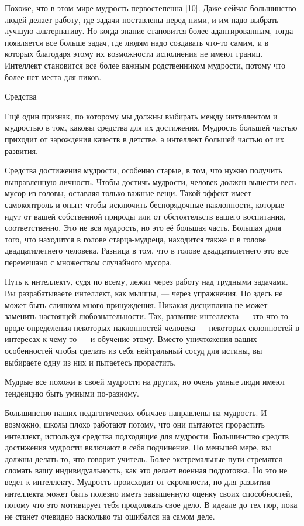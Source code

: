 \documentclass[ebook,12pt,oneside,openany]{memoir}
\begin{document}
Похоже, что в этом мире мудрость первостепенна [10]. Даже сейчас
большинство людей делает работу, где задачи поставлены перед ними, и
им надо выбрать лучшую альтернативу. Но когда знание становится более
адаптированным, тогда появляется все больше задач, где людям надо
создавать что-то самим, и в которых благодаря этому их возможности
исполнения не имеют границ. Интеллект становится все более важным
родственником мудрости, потому что более нет места для пиков.

Средства

Ещё один признак, по которому мы должны выбирать между интеллектом и
мудростью в том, каковы средства для их достижения. Мудрость большей
частью приходит от зарождения качеств в детстве, а интеллект большей
частью от их развития.

Средства достижения мудрости, особенно старые, в том, что нужно
получить выправленную личность. Чтобы достичь мудрости, человек должен
вынести весь мусор из головы, оставляя только важные вещи. Такой
эффект имеет самоконтроль и опыт: чтобы исключить беспорядочные
наклонности, которые идут от вашей собственной природы или от
обстоятельств вашего воспитания, соответственно. Это не вся мудрость,
но это её большая часть. Большая доля того, что находится в голове
старца-мудреца, находится также и в голове двадцатилетнего человека.
Разница в том, что в голове двадцатилетнего это все перемешано с
множеством случайного мусора.

Путь к интеллекту, судя по всему, лежит через работу над трудными
задачами. Вы разрабатываете интеллект, как мышцы, — через упражнения.
Но здесь не может быть слишком много принуждения. Никакая дисциплина
не может заменить настоящей любознательности. Так, развитие интеллекта
— это что-то вроде определения некоторых наклонностей человека —
некоторых склонностей в интересах к чему-то — и обучение этому. Вместо
уничтожения ваших особенностей чтобы сделать из себя нейтральный сосуд
для истины, вы выбираете одну из них и пытаетесь прорастить.

Мудрые все похожи в своей мудрости на других, но очень умные люди
имеют тенденцию быть умными по-разному.

Большинство наших педагогических обычаев направлены на мудрость. И
возможно, школы плохо работают потому, что они пытаются прорастить
интеллект, используя средства подходящие для мудрости. Большинство
средств достижения мудрости включают в себя подчинение. По меньшей
мере, вы должны делать то, что говорит учитель. Более экстремальные
пути стремятся сломать вашу индивидуальность, как это делает военная
подготовка. Но это не ведет к интеллекту. Мудрость происходит от
скромности, но для развития интеллекта может быть полезно иметь
завышенную оценку своих способностей, потому что это мотивирует тебя
продолжать свое дело. В идеале до тех пор, пока не станет очевидно
насколько ты ошибался на самом деле.
\end{document}

